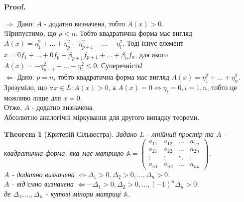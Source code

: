 \documentclass[a4paper, 10pt]{article}
\makeatletter
\def\qed{$\blacksquare$}
\def\rightproof{$\boxed{\Rightarrow}$ }
\def\leftproof{$\boxed{\Leftarrow}$ }
\theoremstyle{theoremdd}
\newtheorem{theorem}{Theorem}[subsection]
\theoremstyle{theoremdd}
\theoremstyle{theoremdd}
\theoremstyle{theoremdd}
\theoremstyle{theoremdd}
\theoremstyle{theoremdd}
\theoremstyle{theoremdd}
\theoremstyle{theoremdd}
\renewenvironment{proof}[1][Proof.\\]{\par
\pushQED{\hfill \qed}%
\normalfont \topsep6\p@\@plus6\p@\relax
\trivlist
\item\relax
{\bfseries
#1\@addpunct{.}}\hspace\labelsep\ignorespaces
}{%
\popQED\endtrivlist\@endpefalse
}
\makeatother
\begin{document}
\begin{proof}
\rightproof Дано: $A$ - додатно визначена, тобто $A(x) > 0$.\\
!Припустимо, що $p < n$. Тобто квадратична форма має вигляд $A(x) = \eta_1^2 + \dots + \eta_p^2 - \eta_{p+1}^2 - \dots - \eta_l^2$. Тоді існує елемент $x = 0f_1 + \dots + 0f_p + \beta_{p+1}f_{p+1} + \dots + \beta_n f_n$, для якого $A(x) = -\eta_{p+1}^2 - \dots - \eta_l^2 \leq 0$. Суперечність!
\bigskip \\
\leftproof Дано: $p = n$, тобто квадратична форма має вигляд $A(x) = \eta_1^2 + \dots + \eta_n^2$. Зрозуміло, що $\forall x \in L: A(x) > 0$, а $A(x) = 0 \iff \eta_i = 0, i = \overline{1,n}$, тобто це можливо лише для $x = 0$. \\
Отже, $A$ - додатно визначена.
\bigskip \\
Абсолютно аналогічні міркування для другого випадку теореми.
\end{proof}

\begin{theorem}[Критерій Сільвестра]
Задано $L$ - лінійний простір та $A$ - квадратична форма, яка має матрицю $\mathbb{A} = \begin{pmatrix}
a_{11} & a_{12} & \dots & a_{1n} \\
a_{21} & a_{22} & \dots & a_{2n} \\
\vdots & \vdots & \ddots & \vdots \\
a_{n1} & a_{n2} & \dots & a_{nn}
\end{pmatrix}$.\\
$A$ - додатно визначена $\iff \Delta_1 > 0, \Delta_2 > 0, \dots, \Delta_n > 0$.\\
$A$ - від'ємно визначена $\iff -\Delta_1 > 0, \Delta_2 > 0, \dots, (-1)^n\Delta_n > 0$.\\
де $\Delta_1,\dots,\Delta_n$ - кутові мінори матриці $\mathbb{A}$.
\end{theorem}
\end{document}
